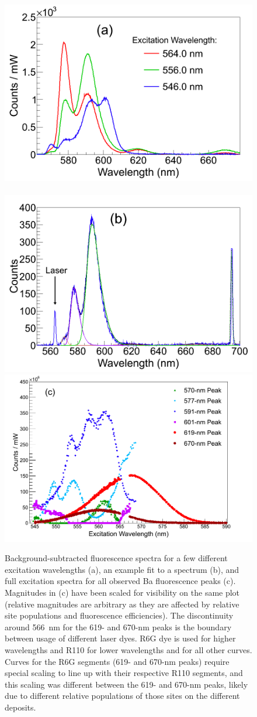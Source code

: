 \begin{figure} %
        \centering
                \includegraphics[width=.5\textwidth]{figures/excitspec_grn_spectra_v2.png}
                ~
                \includegraphics[width=.5\textwidth]{figures/excitspec_grn_spectra_fit.png}
                \includegraphics[width=.95\textwidth]{figures/excitspec_grn.png}
                \caption{Background-subtracted fluorescence spectra for a few different excitation wavelengths (a), an example fit to a spectrum (b), and full excitation spectra for all observed Ba fluorescence peaks (c).  Magnitudes in (c) have been scaled for visibility on the same plot (relative magnitudes are arbitrary as they are affected by relative site populations and fluorescence efficiencies).  The discontinuity around 566~nm for the 619- and 670-nm peaks is the boundary between usage of different laser dyes.  R6G dye is used for higher wavelengths and R110 for lower wavelengths and for all other curves.  Curves for the R6G segments (619- and 670-nm peaks) require special scaling to line up with their respective R110 segments, and this scaling was different between the 619- and 670-nm peaks, likely due to different relative populations of those sites on the different deposits.}
\label{fig:excitspecGrn}
\end{figure}

